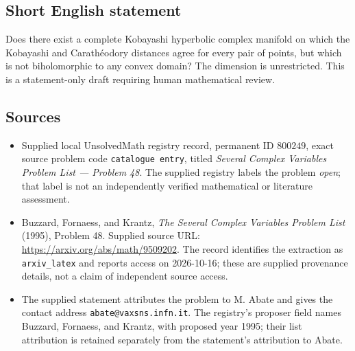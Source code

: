 \documentclass[11pt]{article}
\begin{document}
\subsection{Short English statement}
Does there exist a complete Kobayashi hyperbolic complex manifold on which the Kobayashi and Carath\'eodory distances agree for every pair of points, but which is not biholomorphic to any convex domain? The dimension is unrestricted. This is a statement-only draft requiring human mathematical review.
\subsection{Sources}
\begin{itemize}
\item Supplied local UnsolvedMath registry record, permanent ID \(800249\), exact source problem code \texttt{catalogue entry}, titled \emph{Several Complex Variables Problem List --- Problem 48}. The supplied registry labels the problem \emph{open}; that label is not an independently verified mathematical or literature assessment.
\item Buzzard, Fornaess, and Krantz, \emph{The Several Complex Variables Problem List} (1995), Problem 48. Supplied source URL: \url{https://arxiv.org/abs/math/9509202}. The record identifies the extraction as \texttt{arxiv\_latex} and reports access on 2026-10-16; these are supplied provenance details, not a claim of independent source access.
\item The supplied statement attributes the problem to M. Abate and gives the contact address \texttt{abate@vaxsns.infn.it}. The registry's proposer field names Buzzard, Fornaess, and Krantz, with proposed year 1995; their list attribution is retained separately from the statement's attribution to Abate.
\end{itemize}
\end{document}
